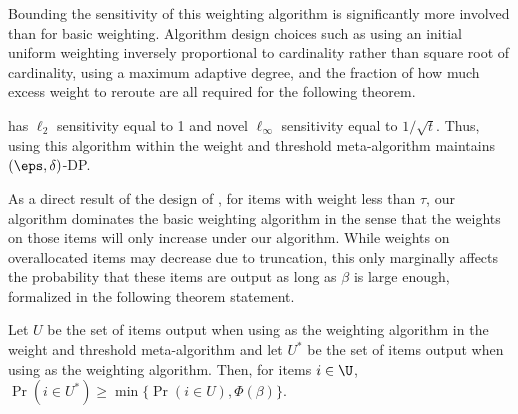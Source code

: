 Bounding the sensitivity of this weighting algorithm is significantly more involved than for basic weighting. Algorithm design choices such as using an initial uniform weighting inversely proportional to cardinality rather than square root of cardinality, using a maximum adaptive degree, and the fraction of how much excess weight to reroute are all required for the following theorem.

\begin{theorem}[Informal]
\ouralgo{} has $\ell_2$ sensitivity equal to 1 and novel $\ell_\infty$ sensitivity equal to $1/\sqrt{t}$. Thus, using this algorithm within the weight and threshold meta-algorithm maintains $(\eps, \delta)$-DP.
\end{theorem}

As a direct result of the design of \ouralgo{}, for items with weight less than $\tau$, our algorithm dominates the basic weighting algorithm in the sense that the weights on those items will only increase under our algorithm. While weights on overallocated items may decrease due to truncation, this only marginally affects the probability that these items are output as long as $\beta$ is large enough, formalized in the following theorem statement.

\begin{theorem}[Informal]
Let $U$ be the set of items output when using \basicalgo{} as the weighting algorithm in the weight and threshold meta-algorithm and let $U^*$ be the set of items output when using \ouralgo{} as the weighting algorithm.
Then, for items $i \in \U$, $\Pr\left(i \in U^*\right) \geq \min\{\Pr\left(i \in U\right), \Phi(\beta)\}$.
\end{theorem}